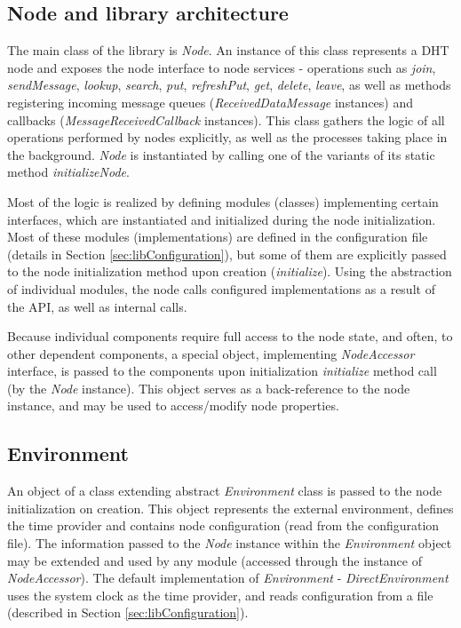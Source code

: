 \subsection{Node and library architecture}

The main class of the library is \emph{Node}. An instance of this class represents a DHT node and exposes the node interface to node services - operations such as \emph{join}, \emph{sendMessage}, \emph{lookup}, \emph{search}, \emph{put}, \emph{refreshPut}, \emph{get}, \emph{delete}, \emph{leave}, as well as methods registering incoming message queues (\emph{ReceivedDataMessage} instances) and callbacks (\emph{MessageReceivedCallback} instances). This class gathers the logic of all operations performed by nodes explicitly, as well as the processes taking place in the background. \emph{Node} is instantiated by calling one of the variants of its static method \emph{initializeNode}.

Most of the logic is realized by defining modules (classes) implementing certain interfaces, which are instantiated and initialized during the node initialization. Most of these modules (implementations) are defined in the configuration file (details in Section \ref{sec:libConfiguration}), but some of them are explicitly passed to the node initialization method upon creation (\emph{initialize}). Using the abstraction of individual modules, the node calls configured implementations as a result of the API, as well as internal calls.

Because individual components require full access to the node state, and often, to other dependent components, a special object, implementing \emph{NodeAccessor} interface, is passed to the components upon initialization \emph{initialize} method call (by the \emph{Node} instance). This object serves as a back-reference to the node instance, and may be used to access/modify node properties.




\subsection{Environment}
\label{sec:libEnvironment}

An object of a class extending abstract \emph{Environment} class is passed to the node initialization on creation. This object represents the external environment, defines the time provider and contains node configuration (read from the configuration file). The information passed to the \emph{Node} instance within the \emph{Environment} object may be extended and used by any module (accessed through the instance of \emph{NodeAccessor}). The default implementation of \emph{Environment} - \emph{DirectEnvironment} uses the system clock as the time provider, and reads configuration from a file (described in Section \ref{sec:libConfiguration}).




